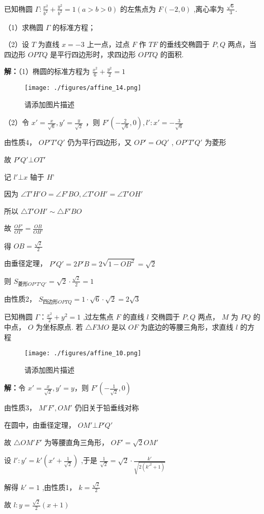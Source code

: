 \begin{example}{}
已知椭圆 \(\Gamma:\frac{x^2}{b^2}+\frac{y^2}{b^2}=1(a>b>0)\) 的左焦点为 \(F(-2,0)\) ,离心率为 \(\frac{\sqrt{6}}{3}\).

（1）求椭圆 \(\Gamma\) 的标准方程；

（2）设 \(T\) 为直线 \(x=-3\) 上一点，过点 \(F\) 作 \(TF\) 的垂线交椭圆于 \(P,Q\) 两点，当四边形 \(OPTQ\) 是平行四边形时，求四边形 \(OPTQ\) 的面积.

\textbf{解：}（1）椭圆的标准方程为 \(\frac{x^2}{6}+\frac{y^2}{2}=1\)
\begin{figure}[ht]
\centering
\texttt{[image: ./figures/affine\_14.png]}
\caption{请添加图片描述} \label{affine_fig14}
\end{figure}
（2）令 \(x'=\frac{x}{\sqrt{6}},y'=\frac{y}{\sqrt{2}}\) ，则 \(F'\left(-\frac{2}{\sqrt{6}},0\right) , l':x'=-\frac{3}{\sqrt{6}}\)

由性质4， \(OP'T'Q'\) 仍为平行四边形，又 \(OP'=OQ'\) , \(OP'T'Q'\) 为菱形

故 \(P'Q'\bot OT'\)

记  \(l'\bot x\) 轴于 \(H’\) 

因为 \(\angle T'H'O=\angle F'BO,\angle T'OH'=\angle T'OH'\)

所以 \(\triangle T'OH'\sim\triangle F'BO\)

故 \(\frac{OF'}{OT'}=\frac{OB}{OH'}\)

得 \(OB=\frac{\sqrt{2}}{2}\)

由垂径定理， \(P'Q'=2P'B=2\sqrt{1-OB^2}=\sqrt{2}\)

则 \(S_{菱形OP'T'Q'}=\sqrt{2}\cdot\frac{\sqrt{2}}{2}=1\)

由性质2， \(S_{四边形OPTQ}=1\cdot \sqrt{6}\cdot\sqrt{2}=2\sqrt{3}\) 
\end{example}

\begin{example}{}
已知椭圆 \(\Gamma：\frac{x^2}{2}+y^2=1\) ,过左焦点 \(F\) 的直线 \(l\) 交椭圆于 \(P,Q\) 两点， \(M\) 为 \(PQ\) 的中点， \(O\) 为坐标原点. 若 \(\triangle FMO\) 是以 \(OF\) 为底边的等腰三角形，求直线 \(l\)  的方程
\begin{figure}[ht]
\centering
\texttt{[image: ./figures/affine\_10.png]}
\caption{请添加图片描述} \label{affine_fig10}
\end{figure}
\textbf{解：}令 \(x'=\frac{x}{\sqrt{2}},y'=y\)，则 \(F'(-\frac{1}{\sqrt{2}},0)\)

由性质3， \(M'F',OM'\) 仍旧关于铅垂线对称

在圆中，由垂径定理， \(OM'\bot P'Q'\)

故 \(\triangle OM'F'\) 为等腰直角三角形， \(OF'=\sqrt{2} OM'\)

设 \(l':y'=k'\left(x'+\frac{1}{\sqrt{2}}\right)\) ,于是 \(\frac{1}{\sqrt{2}}=\sqrt{2}\cdot \frac{k'}{\sqrt{2(k'^2+1)}}\)

解得 \(k'=1\) ,由性质1， \(k=\frac{\sqrt{2}}{2}\)

故 \(l:y=\frac{\sqrt{2}}{2}(x+1)\) 
\end{example}

